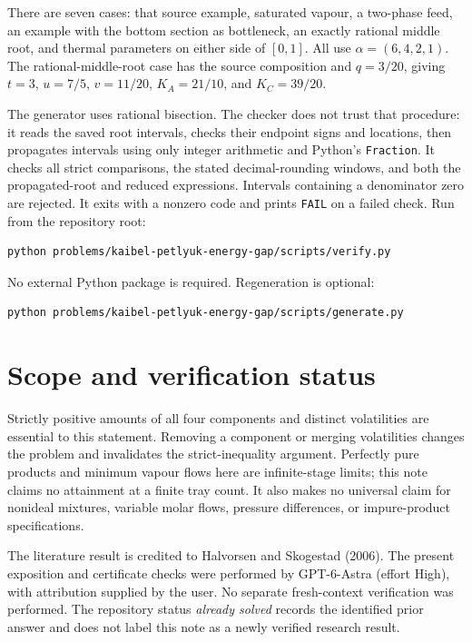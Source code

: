 \documentclass[11pt,a4paper]{report}
\begin{document}
There are seven cases: that source example, saturated vapour,
a two-phase feed, an example with the bottom section as bottleneck,
an exactly rational middle root, and thermal parameters on either
side of \([0,1]\). All use \(\alpha=(6,4,2,1)\).
The rational-middle-root case has the source composition and
\(q=3/20\), giving \(t=3\), \(u=7/5\), \(v=11/20\),
\(K_A=21/10\), and \(K_C=39/20\).

The generator uses rational bisection. The checker does not trust that
procedure: it reads the saved root intervals, checks their endpoint
signs and locations, then propagates intervals using only integer
arithmetic and Python's \texttt{Fraction}. It checks all strict comparisons,
the stated decimal-rounding windows, and both the propagated-root and
reduced expressions. Intervals containing a denominator zero are rejected.
It exits with a nonzero code and prints \texttt{FAIL} on a failed check.
Run from the repository root:
\begin{verbatim}
python problems/kaibel-petlyuk-energy-gap/scripts/verify.py
\end{verbatim}
No external Python package is required. Regeneration is optional:
\begin{verbatim}
python problems/kaibel-petlyuk-energy-gap/scripts/generate.py
\end{verbatim}

\section{Scope and verification status}
Strictly positive amounts of all four components and distinct volatilities
are essential to this statement. Removing a component or merging
volatilities changes the problem and invalidates the strict-inequality
argument. Perfectly pure products and minimum vapour flows here are
infinite-stage limits; this note claims no attainment at a finite tray count.
It also makes no universal claim for nonideal mixtures, variable molar
flows, pressure differences, or impure-product specifications.

The literature result is credited to Halvorsen and Skogestad (2006).
The present exposition and certificate checks were performed by
GPT-6-Astra (effort High), with attribution supplied by the user.
No separate fresh-context verification was performed. The repository
status \emph{already solved} records the identified prior answer and
does not label this note as a newly verified research result.

\paperreferences
\end{document}
